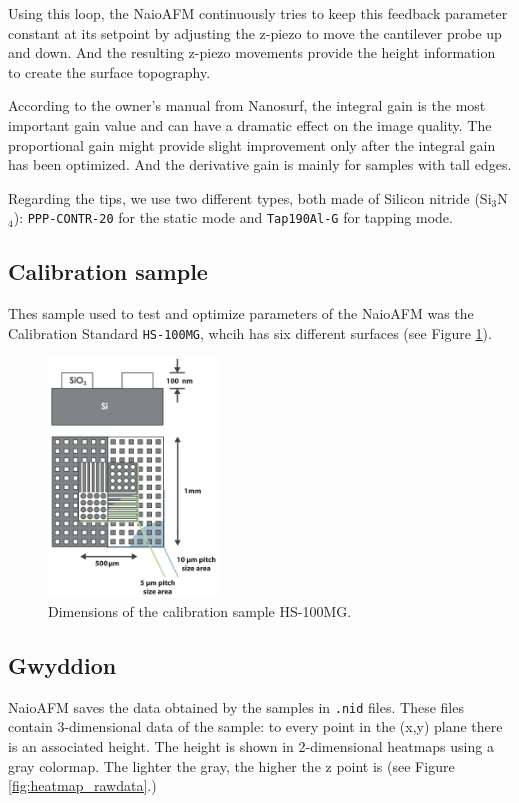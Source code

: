 \documentclass[11pt,a4paper]{article}
\begin{document}
Using this loop, the NaioAFM continuously tries to keep this feedback parameter constant at its setpoint by adjusting the z-piezo to move the cantilever probe up and down. And the resulting z-piezo movements provide the height information to create the surface topography.

According to the owner's manual from Nanosurf, the integral gain is the most important gain value and can have a dramatic effect on the image quality. The proportional gain might provide slight improvement only after the integral gain has been optimized. And the derivative gain is mainly for samples with tall edges.

Regarding the tips, we use two different types, both made of Silicon nitride (Si$_3$N$_4$): \texttt{PPP-CONTR-20} for the static mode and \texttt{Tap190Al-G} for tapping mode.

\subsection{Calibration sample}

Thes sample used to test and optimize parameters of the NaioAFM was the Calibration Standard \texttt{HS-100MG}, whcih has six different surfaces (see Figure \ref{fig:HS-100MG}).

\begin{figure}[H]
\centering
\includegraphics[width=0.4\textwidth]{HS-100MG}
\caption{Dimensions of the calibration sample HS-100MG.}
\label{fig:HS-100MG}
\end{figure}

\subsection{Gwyddion}

NaioAFM saves the data obtained by the samples in \texttt{.nid} files. These files contain 3-dimensional data of the sample: to every point in the (x,y) plane there is an associated height. The height is shown in 2-dimensional heatmaps using a gray colormap. The lighter the gray, the higher the z point is (see Figure \ref{fig:heatmap_rawdata}.)
\end{document}
